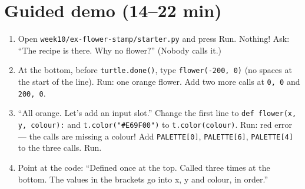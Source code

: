 \section{Guided demo (14--22 min)}
\begin{workedexample}
\begin{enumerate}[leftmargin=1.4em,itemsep=1pt]
  \item Open \texttt{week10/ex-flower-stamp/starter.py} and press Run. Nothing! Ask: \enquote{The recipe is there. Why no flower?} (Nobody calls it.)
  \item At the bottom, before \texttt{turtle.done()}, type \texttt{flower(-200, 0)} (no spaces at the start of the line). Run: one orange flower. Add two more calls at \texttt{0, 0} and \texttt{200, 0}.
  \item \enquote{All orange. Let's add an input slot.} Change the first line to \texttt{def flower(x, y, colour):} and \texttt{t.color("\#E69F00")} to \texttt{t.color(colour)}. Run: red error --- the calls are missing a colour! Add \texttt{PALETTE[0]}, \texttt{PALETTE[6]}, \texttt{PALETTE[4]} to the three calls. Run.
  \item Point at the code: \enquote{Defined once at the top. Called three times at the bottom. The values in the brackets go into x, y and colour, in order.}
\end{enumerate}
\end{workedexample}

